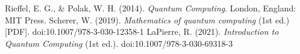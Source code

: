 \newpage
{}
\begin{thebibliography}{9}
        Rieffel, E. G., \& Polak, W. H. (2014). \emph{Quantum Computing}. London, England: MIT Press.
        Scherer, W. (2019). \emph{Mathematics of quantum computing} (1st ed.) [PDF]. doi:10.1007/978-3-030-12358-1
        LaPierre, R. (2021). \emph{Introduction to Quantum Computing} (1st ed.). doi:10.1007/978-3-030-69318-3
\end{thebibliography}

